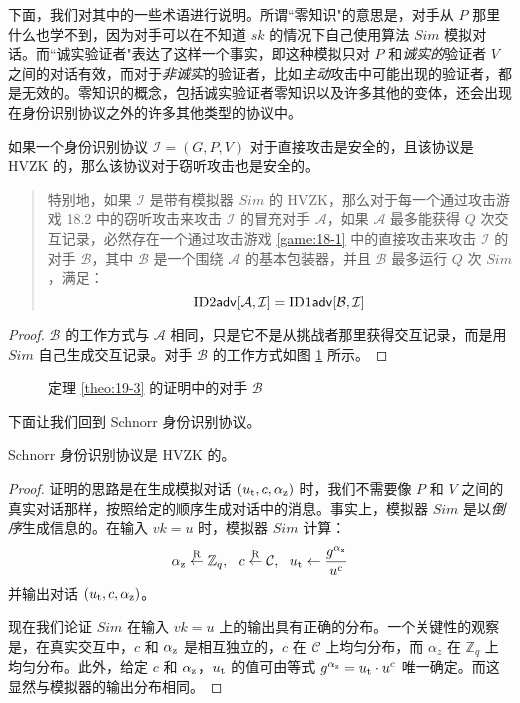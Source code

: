 下面，我们对其中的一些术语进行说明。所谓``零知识"的意思是，对手从 $P$ 那里什么也学不到，因为对手可以在不知道 $sk$ 的情况下自己使用算法 $Sim$ 模拟对话。而``诚实验证者"表达了这样一个事实，即这种模拟只对 $P$ 和\emph{诚实的}验证者 $V$ 之间的对话有效，而对于\emph{非诚实}的验证者，比如\emph{主动}攻击中可能出现的验证者，都是无效的。零知识的概念，包括诚实验证者零知识以及许多其他的变体，还会出现在身份识别协议之外的许多其他类型的协议中。

\begin{theorem}\label{theo:19-3}
	如果一个身份识别协议 $\mathcal{I}=(G,P,V)$ 对于直接攻击是安全的，且该协议是 HVZK 的，那么该协议对于窃听攻击也是安全的。
	\begin{quote}
		特别地，如果 $\mathcal{I}$ 是带有模拟器 ${Sim}$ 的 HVZK，那么对于每一个通过攻击游戏 18.2 中的窃听攻击来攻击 $\mathcal{I}$ 的冒充对手 $\mathcal{A}$，如果 $\mathcal{A}$ 最多能获得 $Q$ 次交互记录，必然存在一个通过攻击游戏 \ref{game:18-1} 中的直接攻击来攻击 $\mathcal{I}$ 的对手 $\mathcal{B}$，其中 $\mathcal{B}$ 是一个围绕 $\mathcal{A}$ 的基本包装器，并且 $\mathcal{B}$ 最多运行 $Q$ 次 ${Sim}$，满足：
		$${\rm ID2\mathsf{adv}}[\mathcal{A},\mathcal{I}]=
			{\rm ID1\mathsf{adv}}[\mathcal{B},\mathcal{I}]$$
	\end{quote}
\end{theorem}

\begin{proof}
	$\mathcal{B}$ 的工作方式与 $\mathcal{A}$ 相同，只是它不是从挑战者那里获得交互记录，而是用 ${Sim}$ 自己生成交互记录。对手 $\mathcal{B}$ 的工作方式如图 \ref{fig:19-2} 所示。
\end{proof}

\begin{figure}
  \centering
  
  \caption{定理 \ref{theo:19-3} 的证明中的对手 $\mathcal{B}$}
  \label{fig:19-2}
\end{figure}

下面让我们回到 Schnorr 身份识别协议。

\begin{theorem}\label{theo:19-4}
	Schnorr 身份识别协议是 HVZK 的。
\end{theorem}

\begin{proof}
	证明的思路是在生成模拟对话 $(u_{\rm t},c,\alpha_{\rm z})$ 时，我们不需要像 $P$ 和 $V$ 之间的真实对话那样，按照给定的顺序生成对话中的消息。事实上，模拟器 ${Sim}$ 是以\emph{倒序}生成信息的。在输入 $vk=u$ 时，模拟器 ${Sim}$ 计算：
		$$\alpha_{\rm z}\overset{\rm R}\leftarrow\mathbb{Z}_q,~~
		c\overset{\rm R}\leftarrow\mathcal{C},~~
		u_{\rm t}\leftarrow\frac{g^{\alpha_{\rm z}}}{u^c}$$
	并输出对话 $(u_{\rm t},c,\alpha_{\rm z})$。
	
	现在我们论证 ${Sim}$ 在输入 $vk=u$ 上的输出具有正确的分布。一个关键性的观察是，在真实交互中，$c$ 和 $\alpha_{\rm z}$ 是相互独立的，$c$ 在 $\mathcal{C}$ 上均匀分布，而 $\alpha_z$ 在 $\mathbb{Z}_q$ 上均匀分布。此外，给定 $c$ 和 $\alpha_{\rm z}$，$u_{\rm t}$ 的值可由等式 $g^{\alpha_{\rm z}}=u_{\rm t}\cdot u^c$ 唯一确定。而这显然与模拟器的输出分布相同。
\end{proof}

